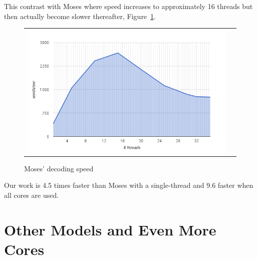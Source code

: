 \documentclass[11pt]{article}
\begin{document}
This contrast with Moses where speed increases to approximately 16 threads but then actually become slower thereafter, Figure~\ref{fig:moses-speed}.
\begin{figure}[h]
\centering
\begin{tabular}{cc}
{\includegraphics[scale=0.4]{moses-scalability.png}} 
\end{tabular}
\caption{Moses' decoding speed}
\label{fig:moses-speed}
\end{figure} 


Our work is 4.5 times faster than Moses with a single-thread and 9.6 faster when all cores are used.

 

\section{Other Models and Even More Cores}
\end{document}
